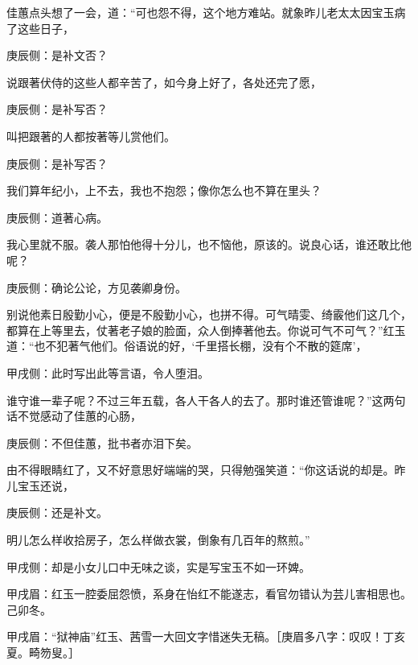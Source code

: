 \begin{parag}
    佳蕙点头想了一会，道：“可也怨不得，这个地方难站。就象昨儿老太太因宝玉病了这些日子，\begin{note}庚辰侧：是补文否？\end{note}说跟著伏侍的这些人都辛苦了，如今身上好了，各处还完了愿，\begin{note}庚辰侧：是补写否？\end{note}叫把跟著的人都按著等儿赏他们。\begin{note}庚辰侧：是补写否？\end{note}我们算年纪小，上不去，我也不抱怨；像你怎么也不算在里头？\begin{note}庚辰侧：道著心病。\end{note}我心里就不服。袭人那怕他得十分儿，也不恼他，原该的。说良心话，谁还敢比他呢？\begin{note}庚辰侧：确论公论，方见袭卿身份。\end{note}别说他素日殷勤小心，便是不殷勤小心，也拼不得。可气晴雯、绮霰他们这几个，都算在上等里去，仗著老子娘的脸面，众人倒捧著他去。你说可气不可气？”红玉道：“也不犯著气他们。俗语说的好，‘千里搭长棚，没有个不散的筵席’，\begin{note}甲戌侧：此时写出此等言语，令人堕泪。\end{note}谁守谁一辈子呢？不过三年五载，各人干各人的去了。那时谁还管谁呢？”这两句话不觉感动了佳蕙的心肠，\begin{note}庚辰侧：不但佳蕙，批书者亦泪下矣。\end{note}由不得眼睛红了，又不好意思好端端的哭，只得勉强笑道：“你这话说的却是。昨儿宝玉还说，\begin{note}庚辰侧：还是补文。\end{note}明儿怎么样收拾房子，怎么样做衣裳，倒象有几百年的熬煎。”\begin{note}甲戌侧：却是小女儿口中无味之谈，实是写宝玉不如一环婢。\end{note}\begin{note}甲戌眉：红玉一腔委屈怨愤，系身在怡红不能遂志，看官勿错认为芸儿害相思也。己卯冬。\end{note}\begin{note}甲戌眉：“狱神庙”红玉、茜雪一大回文字惜迷失无稿。［庚眉多八字：叹叹！丁亥夏。畸笏叟。］\end{note}
\end{parag}



